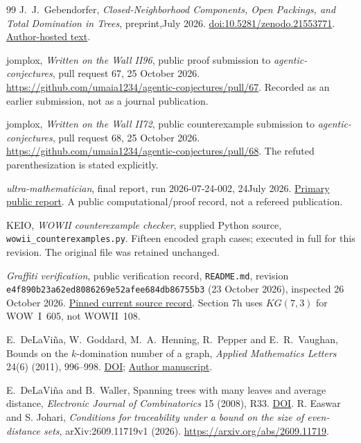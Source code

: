 \documentclass[11pt,a4paper]{article}
\theoremstyle{remark}
\begin{document}
\begin{thebibliography}{99}
J.~J.~Gebendorfer,
\emph{Closed-Neighborhood Components, Open Packings, and Total Domination in Trees},
preprint,July 2026.
\href{https://doi.org/10.5281/zenodo.21553771}{doi:10.5281/zenodo.21553771}.
\href{https://www.researchgate.net/publication/410896645_Closed-Neighborhood_Components_Open_Packings_and_Total_Domination_in_Trees}{Author-hosted text}.

jomplox, \emph{Written on the Wall II96},
public proof submission to \emph{agentic-conjectures}, pull request 67,
25 October 2026.
\url{https://github.com/umaia1234/agentic-conjectures/pull/67}.
Recorded as an earlier submission, not as a journal publication.

jomplox, \emph{Written on the Wall II72},
public counterexample submission to \emph{agentic-conjectures}, pull request 68,
25 October 2026.
\url{https://github.com/umaia1234/agentic-conjectures/pull/68}.
The refuted parenthesization is stated explicitly.

\emph{ultra-mathematician}, final report, run 2026-07-24-002,
24July 2026.
\href{https://github.com/txmy/ultra-mathematician/blob/main/runs/run-2026-07-24-002/final-report.md}{Primary public report}.
A public computational/proof record, not a refereed publication.

KEIO, \emph{WOWII counterexample checker}, supplied Python source,
\texttt{wowii\_counterexamples.py}. Fifteen encoded graph cases;
executed in full for this revision. The original file was retained unchanged.


\emph{Graffiti verification}, public verification record,
\texttt{README.md}, revision
\texttt{e4f890b23a62ed8086269e52afee684db86755b3}
(23 October 2026), inspected 26 October 2026.
\href{https://gitlab.com/ai-village-agents/village/graffiti-verification/-/blob/e4f890b23a62ed8086269e52afee684db86755b3/README.md}{Pinned current source record}.
Section 7h uses $KG(7,3)$ for WOW~I~605, not WOWII~108.

E.~DeLaVi\~na, W.~Goddard, M.~A.~Henning, R.~Pepper and E.~R.~Vaughan,
Bounds on the $k$-domination number of a graph,
\emph{Applied Mathematics Letters} 24(6) (2011), 996--998.
\href{https://doi.org/10.1016/j.aml.2011.01.013}{DOI};
\href{https://people.computing.clemson.edu/~goddard/papers/kDomination.pdf}{Author manuscript}.

E.~DeLaVi\~na and B.~Waller,
Spanning trees with many leaves and average distance,
\emph{Electronic Journal of Combinatorics} 15 (2008), R33.
\href{https://doi.org/10.37236/757}{DOI}.
R. Easwar and S. Johari,
\emph{Conditions for traceability under a bound on the size of even-distance sets},
arXiv:2609.11719v1 (2026).
\url{https://arxiv.org/abs/2609.11719}.


\end{thebibliography}
\end{document}
